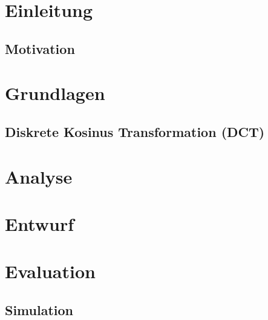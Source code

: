 



 

 \tableofcontents
 

 \printglossary[title={Abkürzungsverzeichnis}] 
 
 \chapter{Einleitung}
 \section{Motivation}
 
 
 
 \chapter{Grundlagen}
 
 
  
 \section{Diskrete Kosinus Transformation (DCT)}
 
 
 
 
 
 \chapter{Analyse}
 
 
 

 
 
 
 \chapter{Entwurf}
  
 
 
 
  
 \chapter{Evaluation}
 \section{Simulation}
